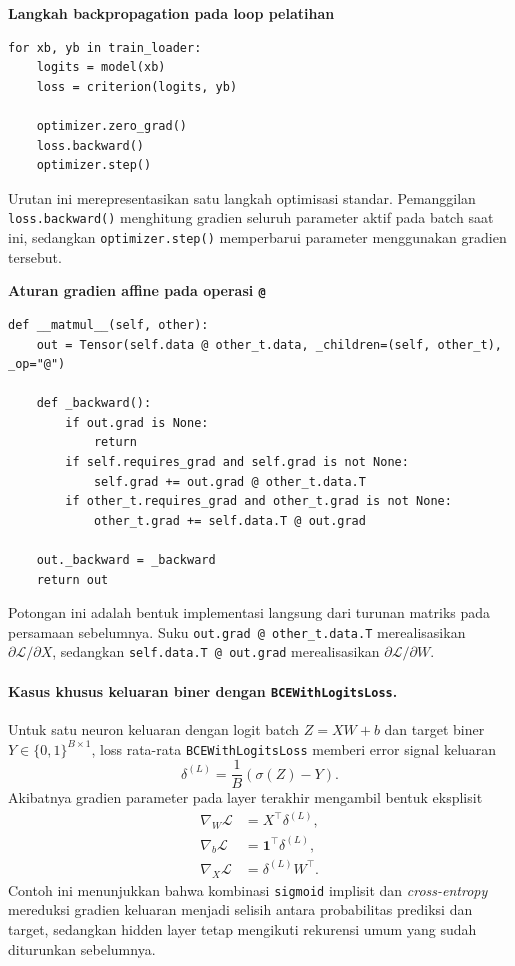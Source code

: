 \documentclass{article}
\begin{document}
\noindent\textbf{Langkah backpropagation pada loop pelatihan}\par
\begin{lstlisting}
for xb, yb in train_loader:
    logits = model(xb)
    loss = criterion(logits, yb)

    optimizer.zero_grad()
    loss.backward()
    optimizer.step()
\end{lstlisting}
Urutan ini merepresentasikan satu langkah optimisasi standar. Pemanggilan \texttt{loss.backward()} menghitung gradien seluruh parameter aktif pada batch saat ini, sedangkan \texttt{optimizer.step()} memperbarui parameter menggunakan gradien tersebut.

\noindent\textbf{Aturan gradien affine pada operasi \texttt{@}}\par
\begin{lstlisting}
def __matmul__(self, other):
    out = Tensor(self.data @ other_t.data, _children=(self, other_t), _op="@")

    def _backward():
        if out.grad is None:
            return
        if self.requires_grad and self.grad is not None:
            self.grad += out.grad @ other_t.data.T
        if other_t.requires_grad and other_t.grad is not None:
            other_t.grad += self.data.T @ out.grad

    out._backward = _backward
    return out
\end{lstlisting}
Potongan ini adalah bentuk implementasi langsung dari turunan matriks pada persamaan sebelumnya. Suku \texttt{out.grad @ other\_t.data.T} merealisasikan $\partial \mathcal{L}/\partial X$, sedangkan \texttt{self.data.T @ out.grad} merealisasikan $\partial \mathcal{L}/\partial W$.

\paragraph{Kasus khusus keluaran biner dengan \texttt{BCEWithLogitsLoss}.}
Untuk satu neuron keluaran dengan logit batch $Z=XW+b$ dan target biner $Y\in\{0,1\}^{B\times 1}$, loss rata-rata \texttt{BCEWithLogitsLoss} memberi error signal keluaran
\begin{equation}
\delta^{(L)}
=
\frac{1}{B}\left(\sigma(Z)-Y\right).
\end{equation}
Akibatnya gradien parameter pada layer terakhir mengambil bentuk eksplisit
\begin{align}
\nabla_W \mathcal{L} &= X^\top \delta^{(L)},\\
\nabla_b \mathcal{L} &= \mathbf{1}^\top \delta^{(L)},\\
\nabla_X \mathcal{L} &= \delta^{(L)}W^\top.
\end{align}
Contoh ini menunjukkan bahwa kombinasi \texttt{sigmoid} implisit dan \textit{cross-entropy} mereduksi gradien keluaran menjadi selisih antara probabilitas prediksi dan target, sedangkan hidden layer tetap mengikuti rekurensi umum yang sudah diturunkan sebelumnya.
\end{document}
